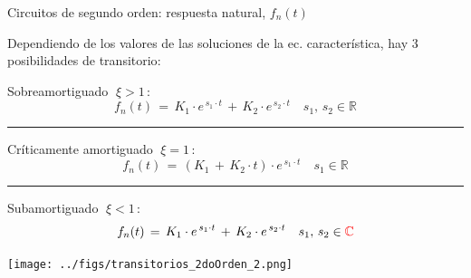 \documentclass[aspectratio=169, usenames,svgnames,dvipsnames]{beamer}
\begin{document}
\begin{frame}{Circuitos de segundo orden: \hspace{3mm}respuesta natural, \hspace{3mm}$f_n(t)$} \label{diapo:transitorios_2doOrden}
    \vspace{2mm}
    
    Dependiendo de los \alert{valores de las soluciones} de la ec. característica, hay \alert{3 posibilidades de transitorio}:

    \vspace{2mm}

    \begin{minipage}[c]{0.4\linewidth} 
        
        \vspace{2mm}
        \alert{Sobreamortiguado} $\; \boxed{\xi>1} \,$:
        \[
            f_n(t) \,=\, K_1 \cdot e^{\, s_1\cdot t} \,+\, K_2 \cdot e^{\, s_2\cdot t} \quad s_1, \, s_2 \in \mathbb{R}
        \]

        \vspace{-3mm}
        \hspace*{-3mm}\noindent\rule{2cm}{0.4pt}
        
        \vspace{2mm}
        \alert{Críticamente amortiguado} $\; \boxed{\xi=1} \,$:
        \[
            f_n(t) \,=\, (K_1 \,+\, K_2 \cdot t) \cdot e^{\, s_1\cdot t} \quad s_1 \in \mathbb{R}
        \]

        \vspace{-3mm}
        
        \hspace*{-3mm}\noindent\rule{2cm}{0.4pt}
        
        \vspace{2mm}
        \alert{Subamortiguado} $\; \boxed{\xi<1} \,$:
        \[
            f_n(t) \,=\, K_1 \cdot e^{\, s_1\cdot t} \,+\, K_2 \cdot e^{\, s_2\cdot t} \quad s_1, \, s_2 \in {\color{red}\mathbb{C}}
        \]
    \end{minipage}
    \begin{minipage}{0.59\linewidth}    

        \hspace{4mm}
        \texttt{[image: ../figs/transitorios\_2doOrden\_2.png]}
        
    \end{minipage}
\end{frame}
\end{document}

